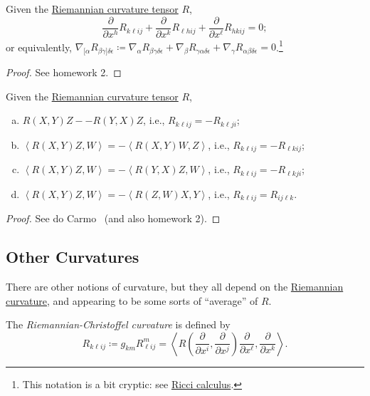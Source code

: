 \begin{proposition}\label{prop:2nd-Bianchi-identity}
	Given the \hyperref[def:Riemannian-curvature]{Riemannian curvature tensor} \(R\),
	\[
		\frac{\partial }{\partial x^h} R_{k \ell i j} + \frac{\partial }{\partial x^k} R_{\ell h i j} + \frac{\partial }{\partial x^{\ell } } R_{h k i j} = 0;
	\]
	or equivalently, \(\nabla _{[\alpha} R_{\beta \gamma ]\delta \epsilon }\coloneqq \nabla _\alpha R_{\beta \gamma \delta \epsilon }+ \nabla _\beta R_{\gamma \alpha \delta \epsilon }+ \nabla _\gamma R_{\alpha \beta \delta \epsilon }= 0\).\footnote{This notation is a bit cryptic: see \href{https://en.wikipedia.org/wiki/Ricci_calculus}{Ricci calculus}.}
\end{proposition}
\begin{proof}
	See homework 2.
\end{proof}

\begin{proposition}
	Given the \hyperref[def:Riemannian-curvature]{Riemannian curvature tensor} \(R\),
	\begin{enumerate}[(a)]
		\item \(R(X, Y)Z - -R(Y, X)Z\), i.e., \(R_{k \ell i j} = -R_{k \ell j i}\);
		\item \(\left\langle R(X, Y)Z, W \right\rangle = -\left\langle R(X, Y)W, Z \right\rangle\), i.e., \(R_{k \ell i j} = -R_{\ell k i j}\);
		\item \(\left\langle R(X, Y)Z, W \right\rangle = -\left\langle R(Y, X)Z, W \right\rangle\), i.e., \(R_{k \ell i j} = -R_{\ell k j i}\);
		\item \(\left\langle R(X, Y)Z, W \right\rangle = -\left\langle R(Z, W)X, Y \right\rangle\), i.e., \(R_{k \ell i j} = R_{i j \ell k}\).
	\end{enumerate}
\end{proposition}
\begin{proof}
	See do Carmo~\cite[Proposition 2.5]{flaherty2013riemannian} (and also homework 2).
\end{proof}

\subsection{Other Curvatures}
There are other notions of curvature, but they all depend on the \hyperref[def:Riemannian-curvature]{Riemannian curvature}, and appearing to be some sorts of ``average'' of \(R\).

\begin{definition}\label{def:Riemannian-Christoffel-curvature}
	The \emph{Riemannian-Christoffel curvature}	is defined by
	\[
		R_{k \ell ij}
		\coloneqq g_{km} R^m_{\ell ij}
		= \left\langle R\left( \frac{\partial }{\partial x^i}, \frac{\partial }{\partial x^j} \right) \frac{\partial }{\partial x^{\ell } }, \frac{\partial }{\partial x^k}  \right\rangle.
	\]
\end{definition}

